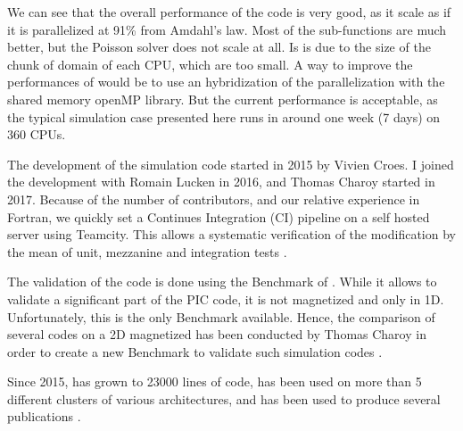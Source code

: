 We can see that the overall performance of the code is very good, as it scale as if it is parallelized at 91\% from Amdahl's law.
Most of the sub-functions are much better, but the Poisson solver does not scale at all.
Is is due to the size of the chunk of domain of each CPU, which are too small.
A way to improve the performances of \LPPic would be to use an hybridization of the parallelization with the shared memory openMP library.
But the current performance is acceptable, as the typical simulation case presented here runs in around one week (7 days) on 360 CPUs.

\vspace{1em}

The development of the  simulation code \LPPic started in 2015 by Vivien Croes.
I joined the development with Romain Lucken in 2016, and Thomas Charoy started in 2017.
Because of the number of contributors, and our relative experience in Fortran, we quickly set a Continues Integration (CI) pipeline on a self hosted server using Teamcity.
This allows a systematic verification of the modification by the mean of unit, mezzanine and integration tests \citep{turner2016}.

The validation of the code is done using the Benchmark of \citet{turner2013}.
While it allows to validate a significant part of the \ac{PIC} code, it is not magnetized and only in \ac{1D}.
Unfortunately, this is the only Benchmark available.
Hence, the comparison of several codes on a \ac{2D} magnetized  has been conducted by Thomas Charoy in order to create a new Benchmark to validate such simulation codes \citep{charoy2019}.


Since 2015, \LPPic has grown to 23000 lines of code, has been used on more than 5 different clusters of various architectures, and has been used to produce several publications \citep{croes2017a,croes2018,tavant2018,tavant2019,lucken2018,lucken2019}.
